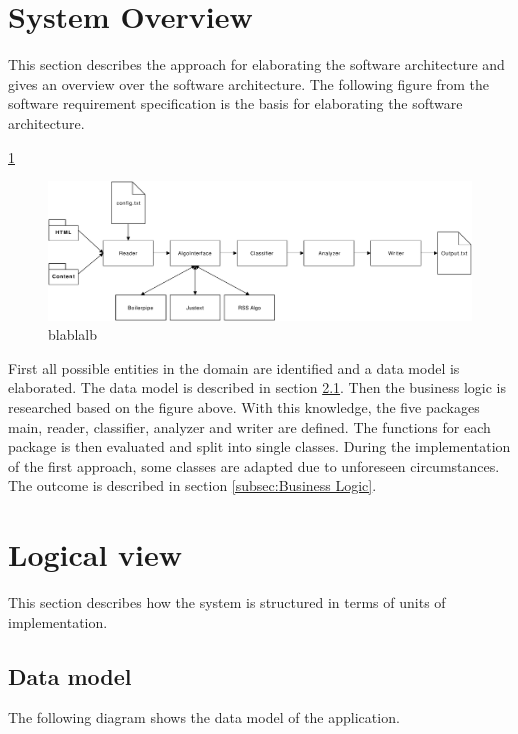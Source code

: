 \section{System Overview}

This section describes the approach for elaborating the software architecture and gives an overview over the software architecture. 
The following figure from the software requirement specification is the basis for elaborating the software architecture.

\ref{asfdsafdsa}
\begin{figure}
\includegraphics[width=15cm]{Figures/AppOverview.pdf}
\caption{blablalb}
\label{asfdsafdsa}
\end{figure}

First all possible entities in the domain are identified and a data model is elaborated. The data model is described in section \ref{subsec:Data model}. Then the business logic is researched based on the figure above. With this knowledge, the five packages main, reader, classifier, analyzer and writer are defined. The functions for each package is then evaluated and split into single classes. During the implementation of the first approach, some classes are adapted due to unforeseen circumstances. The outcome is described in section \ref{subsec:Business Logic}.
\pagebreak

\section{Logical view}

This section describes how the system is structured in terms of units of implementation.


\subsection{Data model}
\label{subsec:Data model}

The following diagram shows the data model of the application. 

